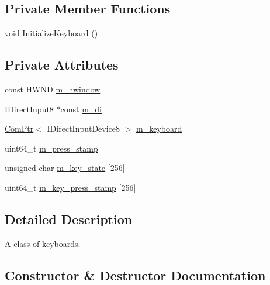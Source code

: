 \subsection*{Private Member Functions}
\begin{DoxyCompactItemize}
\item 
void \hyperlink{classmage_1_1_keyboard_af7aea666e38e5d91ad6bfee2124819a3}{Initialize\+Keyboard} ()
\end{DoxyCompactItemize}
\subsection*{Private Attributes}
\begin{DoxyCompactItemize}
\item 
const H\+W\+ND \hyperlink{classmage_1_1_keyboard_adad9c02695c121898ac578ca25dd5c9a}{m\+\_\+hwindow}
\item 
I\+Direct\+Input8 $\ast$const \hyperlink{classmage_1_1_keyboard_a627eeef05bae81a60c2c44fd039ff7f8}{m\+\_\+di}
\item 
\hyperlink{namespacemage_ae74f374780900893caa5555d1031fd79}{Com\+Ptr}$<$ I\+Direct\+Input\+Device8 $>$ \hyperlink{classmage_1_1_keyboard_a992b8b8caf0d858163e5e9af04302324}{m\+\_\+keyboard}
\item 
uint64\+\_\+t \hyperlink{classmage_1_1_keyboard_a2c638a93d1f61d9d3578a0df8b6a1c39}{m\+\_\+press\+\_\+stamp}
\item 
unsigned char \hyperlink{classmage_1_1_keyboard_a7499df459499f5addd50507ea1e2358c}{m\+\_\+key\+\_\+state} \mbox{[}256\mbox{]}
\item 
uint64\+\_\+t \hyperlink{classmage_1_1_keyboard_a8eb4ce7e4e2395bb27d2ac9236655335}{m\+\_\+key\+\_\+press\+\_\+stamp} \mbox{[}256\mbox{]}
\end{DoxyCompactItemize}


\subsection{Detailed Description}
A class of keyboards. 

\subsection{Constructor \& Destructor Documentation}
\hypertarget{classmage_1_1_keyboard_ac89c8f4132508901ff2ca57c68709928}{}\label{classmage_1_1_keyboard_ac89c8f4132508901ff2ca57c68709928} 
